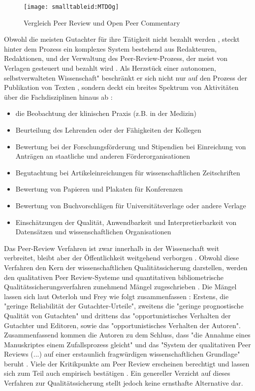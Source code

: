 \begin{figure}[h!]
\texttt{[image: smalltableid:MTDOg]}
\caption{Vergleich Peer Review und Open Peer Commentary}
\end{figure}

Obwohl die meisten Gutachter für ihre Tätigkeit nicht bezahlt werden \cite{yiotis_2013_open}, steckt hinter dem Prozess ein komplexes System bestehend aus Redakteuren, Redaktionen, und der Verwaltung des Peer-Review-Prozess, der meist von Verlagen gesteuert und bezahlt wird \cite{Bargheer_2015} \cite{mueller_2009_peerreview} \cite{Baggs_2006}. Als Herzstück einer autonomen, selbstverwalteten Wissenschaft" \cite{suchen_Hornbostel_2006} beschränkt er sich nicht nur auf den Prozess der Publikation von Texten \cite{mueller_2009_peerreview}, sondern deckt ein breites Spektrum von Aktivitäten über die Fachdisziplinen hinaus ab \cite{Lee_2012}:
\begin{itemize}
\item die Beobachtung der klinischen Praxis (z.B. in der Medizin)
\item Beurteilung des Lehrenden oder der Fähigkeiten der Kollegen
\item Bewertung bei der Forschungsförderung und Stipendien bei Einreichung von Anträgen an staatliche und anderen Förderorganisationen
\item Begutachtung bei Artikeleinreichungen für wissenschaftlichen Zeitschriften
\item Bewertung von Papieren und Plakaten für Konferenzen
\item Bewertung von Buchvorschlägen für Universitätsverlage oder andere Verlage
\item Einschätzungen der Qualität, Anwendbarkeit und Interpretierbarkeit von Datensätzen und wissenschaftlichen Organisationen
\end{itemize}

Das Peer-Review Verfahren ist zwar innerhalb in der Wissenschaft weit verbreitet, bleibt aber der Öffentlichkeit weitgehend verborgen \cite{Konneker_2013}. Obwohl diese Verfahren den Kern der wissenschaftlichen Qualitätssicherung darstellen, werden den qualitativen Peer Review-Systeme und quantitativen bibliometrische Qualitätssicherungsverfahren zunehmend Mängel zugeschrieben \cite{Peters_2014} \cite{Lee_2012} \cite{bar_2009_wissenschaftliche} \cite{osterloh2008anreize} \cite{ware_2008_peer} \cite{Jansen_2007} \cite{smith_1999_opening}. Die Mängel lassen sich laut Osterloh und Frey wie folgt zusammenfassen \cite{osterloh2008anreize}: Erstens, die "geringe Reliabilität der Gutachter-Urteile", zweitens die "geringe prognostische Qualität von Gutachten" und drittens das "opportunistisches Verhalten der Gutachter und Editoren, sowie das "opportunistisches Verhalten der Autoren". Zusammenfassend kommen die Autoren zu dem Schluss, dass "die Annahme eines Manuskriptes einem Zufallsprozess gleicht" und das "System der qualitativen Peer Reviews (...) auf einer erstaunlich fragwürdigen wissenschaftlichen Grundlage" beruht \cite{osterloh2008anreize}. Viele der Kritikpunkte am Peer Review erscheinen berechtigt und lassen sich zum Teil auch empirisch bestätigen \cite{mueller_2009_peerreview}. Ein genereller Verzicht auf dieses Verfahren zur Qualitätssicherung stellt jedoch keine ernsthafte Alternative dar.

